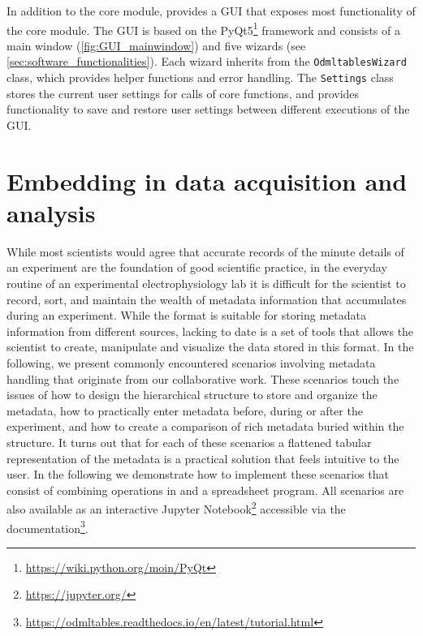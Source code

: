 In addition to the core module,  provides a GUI that exposes most functionality of the core module. The GUI is based on the PyQt5\footnote{\url{https://wiki.python.org/moin/PyQt}} framework and consists of a main window (\cref{fig:GUI_mainwindow}) and five wizards (see \cref{sec:software_functionalities}). Each wizard inherits from the \texttt{OdmltablesWizard} class, which provides helper functions and error handling. The \texttt{Settings} class stores the current user settings for calls of  core functions, and provides functionality to save and restore user settings between different executions of the GUI.


\section{Embedding  in data acquisition and \mbox{analysis}}
\label{sec:Illustrative-Examples}

While most scientists would agree that accurate records of the minute details of an experiment are the foundation of good scientific practice, in the everyday routine of an experimental electrophysiology lab it is difficult for the scientist to record, sort, and maintain the wealth of metadata information that accumulates during an experiment. While the  format is suitable for storing metadata information from different sources, lacking to date is a set of tools that allows the scientist to create, manipulate and visualize the data stored in this format. In the following, we present commonly encountered scenarios involving metadata handling that originate from our collaborative work. These scenarios touch the issues of how to design the hierarchical structure to store and organize the metadata, how to practically enter metadata before, during or after the experiment, and how to create a comparison of rich metadata buried within the  structure. It turns out that for each of these scenarios a flattened tabular representation of the metadata is a practical solution that feels intuitive to the user. In the following we demonstrate how to implement these scenarios that consist of combining operations in  and a spreadsheet program. All scenarios are also available as an interactive Jupyter Notebook\footnote{\url{https://jupyter.org/}} accessible via the  documentation\footnote{\url{https://odmltables.readthedocs.io/en/latest/tutorial.html}}.

